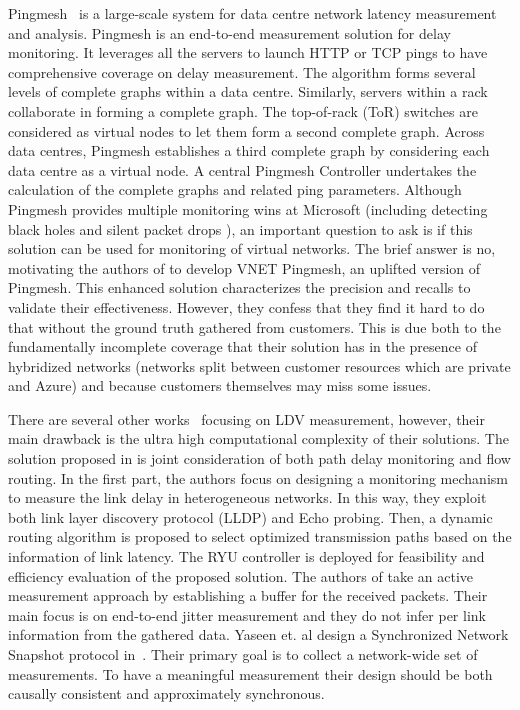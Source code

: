 \documentclass[10pt, journal, letterpaper]{IEEEtran}
\begin{document}
Pingmesh~\cite{guo2015pingmesh} is a large-scale system for data centre network latency measurement and analysis. Pingmesh is an end-to-end measurement solution for delay monitoring. It leverages all the servers to launch HTTP or TCP pings to have comprehensive coverage on delay measurement. The algorithm forms several levels of complete graphs within a data centre. Similarly, servers within a rack collaborate in forming a complete graph. The top-of-rack (ToR) switches are considered as virtual nodes to let them form a second complete graph. Across data centres, Pingmesh establishes a third complete graph by considering each data centre as a virtual node. A central Pingmesh Controller undertakes the calculation of the complete graphs and related ping parameters. Although Pingmesh provides multiple monitoring wins at Microsoft (including detecting black holes and silent packet drops \cite{guo2015pingmesh}), an important question to ask is if this solution can be used for monitoring of virtual networks. The brief answer is no, motivating the authors of \cite{roy2018cloud} to develop VNET Pingmesh, an uplifted version of Pingmesh. This enhanced solution characterizes the precision and recalls to validate their effectiveness. However, they confess that they find it hard to do that without the ground truth gathered from customers. This is due both to the fundamentally incomplete coverage that their solution has in the presence of hybridized networks (networks split between customer resources which are private and Azure) and because customers themselves may miss some issues.

There are several other works~\cite{zhang2020joint, zhang2019sensitive, yaseen2018synchronized} focusing on LDV measurement, however, their main drawback is the ultra high computational complexity of their solutions. The solution proposed in \cite{zhang2020joint} is joint consideration of both path delay monitoring and flow routing. In the first part, the authors focus on designing a monitoring mechanism to measure the link delay in heterogeneous networks. In this way, they exploit both link layer discovery protocol (LLDP) and Echo probing. Then, a dynamic routing algorithm is proposed to select optimized transmission paths based on the information of link latency. The RYU controller is deployed for feasibility and efficiency evaluation of the proposed solution. The authors of \cite{zhang2019sensitive} take an active measurement approach by establishing a buffer for the received packets. Their main focus is on end-to-end jitter measurement and they do not infer per link information from the gathered data. Yaseen et. al design a Synchronized Network Snapshot protocol in~\cite{yaseen2018synchronized}. Their primary goal is to collect a network-wide set of measurements. To have a meaningful measurement their design should be both causally consistent and approximately synchronous. %
\end{document}
